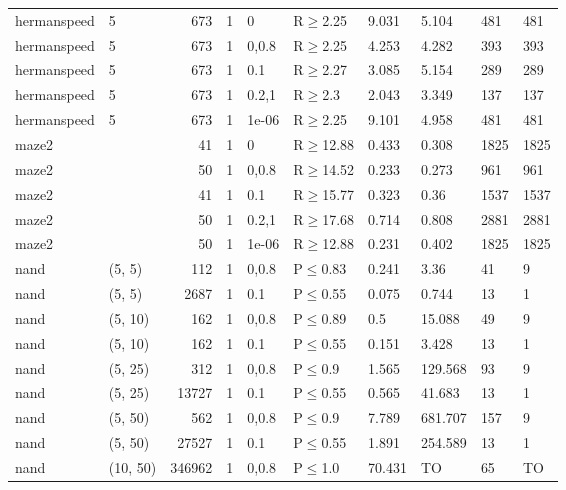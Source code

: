 \begin{longtable}{llrrllllll}
 hermanspeed   & 5        &    	673 & 1 & 0     & R$\geq$2.25  & 9.031   & 5.104   & 481     & 481  \\
 hermanspeed   & 5        &    	673 & 1 & 0,0.8 & R$\geq$2.25  & 4.253   & 4.282   & 393     & 393  \\
 hermanspeed   & 5        &    	673 & 1 & 0.1   & R$\geq$2.27  & 3.085   & 5.154   & 289     & 289  \\
 hermanspeed   & 5        &    	673 & 1 & 0.2,1 & R$\geq$2.3   & 2.043   & 3.349   & 137     & 137  \\
 hermanspeed   & 5        &    	673 & 1 & 1e-06 & R$\geq$2.25  & 9.101   & 4.958   & 481     & 481  \\
 maze2         &          &     	41 & 1 & 0     & R$\geq$12.88 & 0.433   & 0.308   & 1825    & 1825 \\
 maze2         &          &     	50 & 1 & 0,0.8 & R$\geq$14.52 & 0.233   & 0.273   & 961     & 961  \\
 maze2         &          &     	41 & 1 & 0.1   & R$\geq$15.77 & 0.323   & 0.36    & 1537    & 1537 \\
 maze2         &          &     	50 & 1 & 0.2,1 & R$\geq$17.68 & 0.714   & 0.808   & 2881    & 2881 \\
 maze2         &          &     	50 & 1 & 1e-06 & R$\geq$12.88 & 0.231   & 0.402   & 1825    & 1825 \\
 nand          & (5, 5)   &    	112 & 1 & 0,0.8 & P$\leq$0.83  & 0.241   & 3.36    & 41      & 9    \\
 nand          & (5, 5)   &   	2687 & 1 & 0.1   & P$\leq$0.55  & 0.075   & 0.744   & 13      & 1    \\
 nand          & (5, 10)  &    	162 & 1 & 0,0.8 & P$\leq$0.89  & 0.5     & 15.088  & 49      & 9    \\
 nand          & (5, 10)  &    	162 & 1 & 0.1   & P$\leq$0.55  & 0.151   & 3.428   & 13      & 1    \\
 nand          & (5, 25)  &    	312 & 1 & 0,0.8 & P$\leq$0.9   & 1.565   & 129.568 & 93      & 9    \\
 nand          & (5, 25)  &  	13727 & 1 & 0.1   & P$\leq$0.55  & 0.565   & 41.683  & 13      & 1    \\
 nand          & (5, 50)  &    	562 & 1 & 0,0.8 & P$\leq$0.9   & 7.789   & 681.707 & 157     & 9    \\
 nand          & (5, 50)  &  	27527 & 1 & 0.1   & P$\leq$0.55  & 1.891   & 254.589 & 13      & 1    \\
 nand          & (10, 50) & 	346962 & 1 & 0,0.8 & P$\leq$1.0   & 70.431  & TO      & 65      & TO   \\

\end{longtable}
